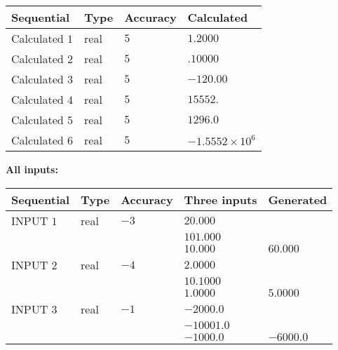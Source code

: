 \documentclass[12pt]{article}
\begin{document}
  
\noindent\begin{tabular}{|l|l|l|l|}
\hline
 Sequential & Type & Accuracy & Calculated \\ 
\hline
 
 
  Calculated $           1$ & real & $           5 $ & 
 $ 1.2000 $ 
 \\  \hline  
 
 
  Calculated $           2$ & real & $           5 $ & 
 $ .10000 $ 
 \\  \hline  
 
 
  Calculated $           3$ & real & $           5 $ & 
 $ -120.00 $ 
 \\  \hline  
 
 
  Calculated $           4$ & real & $           5 $ & 
 $ 15552. $ 
 \\  \hline  
 
 
  Calculated $           5$ & real & $           5 $ & 
 $ 1296.0 $ 
 \\  \hline  
 
 
  Calculated $           6$ & real & $           5 $ & 
 $ -1.5552 \times 10^{6} $ 
 \\  \hline  
 \end{tabular}
   
   
   
   
\noindent\vspace{0.1in}\hspace{-0.08in} {\textbf{\Large{All inputs: }}}
   
   
  
  
\noindent\begin{tabular}{|l|l|l|l|l|}
\hline
 Sequential & Type & Accuracy & Three inputs & Generated \\ 
\hline
 
 
  INPUT $           1$ & real & $          -3 $ & $
 20.000
  $ & \\
  & & &  $
 101.000
  $ & \\
  & & &  $
 10.000
 $ & $ 60.000 $ 
 \\  \hline  
 
 
  INPUT $           2$ & real & $          -4 $ & $
 2.0000
  $ & \\
  & & &  $
 10.1000
  $ & \\
  & & &  $
 1.0000
 $ & $ 5.0000 $ 
 \\  \hline  
 
 
  INPUT $           3$ & real & $          -1 $ & $
 -2000.0
  $ & \\
  & & &  $
 -10001.0
  $ & \\
  & & &  $
 -1000.0
 $ & $ -6000.0 $ 
 \\  \hline  
 \end{tabular}
   
\end{document}
